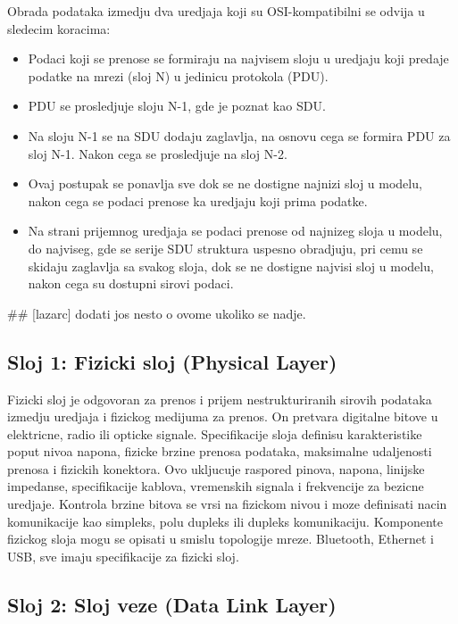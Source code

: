 \documentclass[a4paper,12pt, master]{etf}
\begin{document}
	Obrada podataka izmedju dva uredjaja koji su OSI-kompatibilni se odvija u sledecim 
	koracima:
	\begin{itemize}
		\item Podaci koji se prenose se formiraju na najvisem sloju u uredjaju koji predaje 
		podatke na mrezi (sloj N) u jedinicu protokola (PDU).
		\item PDU se prosledjuje sloju N-1, gde je poznat kao SDU.
		\item Na sloju N-1 se na SDU dodaju zaglavlja, na osnovu cega se formira PDU za sloj 
		N-1. Nakon cega se prosledjuje na sloj N-2.
		\item Ovaj postupak se ponavlja sve dok se ne dostigne najnizi sloj u modelu, nakon 
		cega se podaci prenose ka uredjaju koji prima podatke.
		\item Na strani prijemnog uredjaja se podaci prenose od najnizeg sloja u modelu, do
		najviseg, gde se serije SDU struktura uspesno obradjuju, pri cemu se skidaju zaglavlja 
		sa svakog sloja, dok se ne dostigne najvisi sloj u modelu, nakon cega su dostupni 
		sirovi podaci.
	\end{itemize}

	\#\# [lazarc] dodati jos nesto o ovome ukoliko se nadje.

	\subsection{Sloj 1: Fizicki sloj (Physical Layer)}

	Fizicki sloj je odgovoran za prenos i prijem nestrukturiranih sirovih podataka izmedju 
	uredjaja i fizickog medijuma za prenos. On pretvara digitalne bitove u elektricne, radio 
	ili opticke signale. Specifikacije sloja definisu karakteristike poput nivoa napona, 
	fizicke brzine prenosa podataka, maksimalne udaljenosti prenosa i fizickih konektora. Ovo 
	ukljucuje raspored pinova, napona, linijske impedanse, specifikacije kablova, vremenskih 
	signala i frekvencije za bezicne uredjaje. Kontrola brzine bitova se vrsi na fizickom 
	nivou i moze definisati nacin komunikacije kao simpleks, polu dupleks ili dupleks 
	komunikaciju. Komponente fizickog sloja mogu se opisati u smislu topologije mreze. 
	Bluetooth, Ethernet i USB, sve imaju specifikacije za fizicki sloj.

	\subsection{Sloj 2: Sloj veze (Data Link Layer)}
\end{document}
